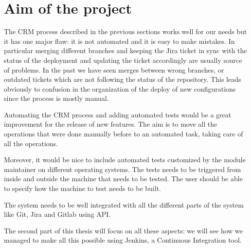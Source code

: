 \section{Aim of the project}

The CRM process described in the previous sections works well for our
needs but it has one major flaw: it is not automated and it is easy to
make mistakes. In particular merging different branches and keeping the
Jira ticket in sync with the status of the deployment and updating the
ticket accordingly are usually source of problems. In the past we have
seen merges between wrong branches, or outdated tickets which are not
following the status of the repository. This leads obviously to confusion
in the organization of the deploy of new configurations since the process
is mostly manual.

Automating the CRM process and adding automated tests would be a great
improvement for the release of new features. The aim is to move all the
operations that were done manually before to an automated task, taking
care of all the operations.

Moreover, it would be nice to include automated tests customized by the
module maintainer on different operating systems. The tests needs to be
triggered from inside and outside the machine that needs to be tested. The
user should be able to specify how the machine to test needs to be built.

The system needs to be well integrated with all the different parts of the
system like Git, Jira and Gitlab using API.

The second part of this thesis will focus on all these aspects: we will
see how we managed to make all this possible using Jenkins, a Continuous
Integration tool.
